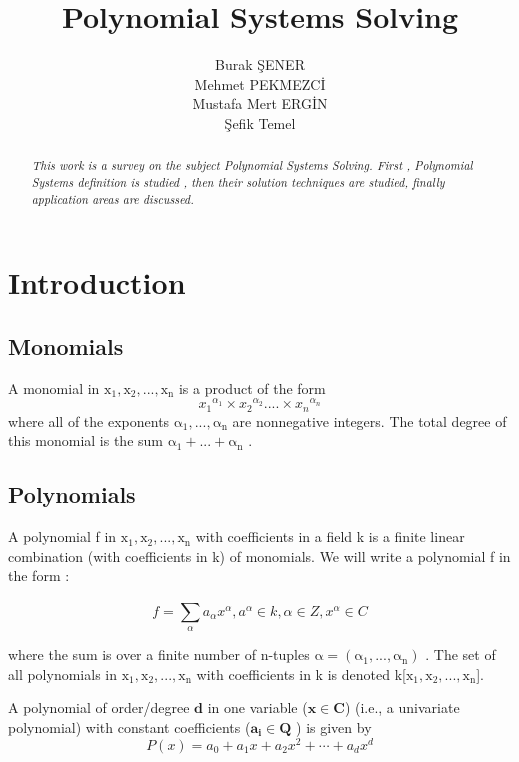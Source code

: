 \documentclass[11pt]{article}
\title{\textbf{Polynomial Systems Solving}}
\author{Burak ŞENER\\
        Mehmet PEKMEZCİ\\
		Mustafa Mert ERGİN\\
		Şefik Temel
		}
\date{}
\begin{document}
\maketitle
\begin{abstract}
\emph{This work is a survey on the subject Polynomial Systems Solving. First , Polynomial Systems definition is studied , then their solution techniques are studied, finally application areas are discussed. }
\end{abstract}

\section{Introduction}

\subsection{Monomials}
A monomial in $\mathrm{x_1, x_2, ...,x_n}$ is a product of the form
\begin{equation}
    {x_1}^{\alpha_1} \times {x_2}^{\alpha_2} .... \times {x_n}^{\alpha_n}
\end{equation}
where all of the exponents $\mathrm{\alpha_1,...,\alpha_n }$ are nonnegative integers. The total degree of this monomial is the sum $\mathrm{\alpha_1+...+\alpha_n }$ .

\subsection{Polynomials}
A polynomial f in $\mathrm{x_1, x_2, ...,x_n}$ with coefficients in a field k is a finite linear combination (with coefficients in k) of monomials. We will write a polynomial f in the form :\cite{coxLittleOshea}

\begin{equation}
   f =  \sum_{\alpha}^{}{a_{\alpha}{x}^{\alpha} }, a^{\alpha} \in k, \alpha \in Z, {x}^{\alpha} \in C
\end{equation}


where the sum is over a finite number of n-tuples $\mathrm{\alpha=(\alpha_1,...,\alpha_n) }$ . The set of all polynomials in $\mathrm{x_1, x_2, ...,x_n}$ with coefficients in k is denoted k[$\mathrm{x_1, x_2, ...,x_n}$].

 A polynomial of order/degree $\mathbf{d}$  in one variable ($\mathbf{x \in C}$) (i.e., a univariate polynomial) with constant coefficients ($\mathbf{a_i \in Q}$ ) is given by \cite{wolframPolynomial}
\begin{equation}
    P(x)=a_{0}+a_{1}x+a_{2}{x}^2+\cdots+a_{d}{x}^d
\end{equation}
\end{document}
